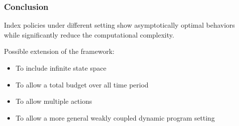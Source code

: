 \documentclass{beamer}
\begin{document}
\begin{frame}
\frametitle{Conclusion}
Index policies under different setting show asymptotically optimal behaviors while significantly reduce the computational complexity.

Possible extension of the framework:
\begin{itemize}
\item To include infinite state space
\item To allow a total budget over all time period
\item To allow multiple actions
\item To allow a more general weakly coupled dynamic program setting
\end{itemize}
\end{frame}
\end{document}
